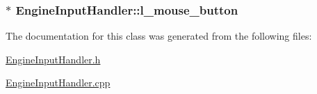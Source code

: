 \subsubsection[{l\+\_\+mouse\+\_\+button}]{$\ast$ Engine\+Input\+Handler\+::l\+\_\+mouse\+\_\+button\hspace{0.3cm}{\ttfamily [private]}}\label{class_engine_input_handler_adf6145027b272f46e7c1381d4c905892}


The documentation for this class was generated from the following files\+:\begin{DoxyCompactItemize}
\item 
\hyperlink{_engine_input_handler_8h}{Engine\+Input\+Handler.\+h}\item 
\hyperlink{_engine_input_handler_8cpp}{Engine\+Input\+Handler.\+cpp}\end{DoxyCompactItemize}
